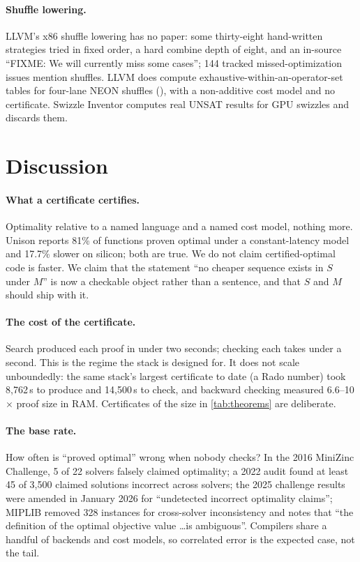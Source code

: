 \paragraph{Shuffle lowering.} LLVM's x86 shuffle lowering has no paper: some thirty-eight hand-written strategies tried in fixed order, a hard combine depth of eight, and an in-source \enquote{FIXME: We will currently miss some cases}; 144 tracked missed-optimization issues mention shuffles. LLVM does compute exhaustive-within-an-operator-set tables for four-lane NEON shuffles (), with a non-additive cost model and no certificate. Swizzle Inventor computes real UNSAT results for GPU swizzles and discards them.

\section{Discussion}
\label{sec:discussion}

\paragraph{What a certificate certifies.} Optimality relative to a named language and a named cost model, nothing more. Unison reports 81\% of functions proven optimal under a constant-latency model and 17.7\% slower on silicon; both are true. We do not claim certified-optimal code is faster. We claim that the statement \enquote{no cheaper sequence exists in $S$ under $M$} is now a checkable object rather than a sentence, and that $S$ and $M$ should ship with it.

\paragraph{The cost of the certificate.} Search produced each proof in under two seconds; checking each takes under a second. This is the regime the stack is designed for. It does not scale unboundedly: the same stack's largest certificate to date (a Rado number) took 8,762\,s to produce and 14,500\,s to check, and backward checking measured 6.6--10$\times$ proof size in RAM. Certificates of the size in \cref{tab:theorems} are deliberate.

\paragraph{The base rate.} How often is \enquote{proved optimal} wrong when nobody checks? In the 2016 MiniZinc Challenge, 5 of 22 solvers falsely claimed optimality; a 2022 audit found at least 45 of 3,500 claimed solutions incorrect across solvers; the 2025 challenge results were amended in January 2026 for \enquote{undetected incorrect optimality claims}; MIPLIB removed 328 instances for cross-solver inconsistency and notes that \enquote{the definition of the optimal objective value \ldots is ambiguous}. Compilers share a handful of backends and cost models, so correlated error is the expected case, not the tail.

